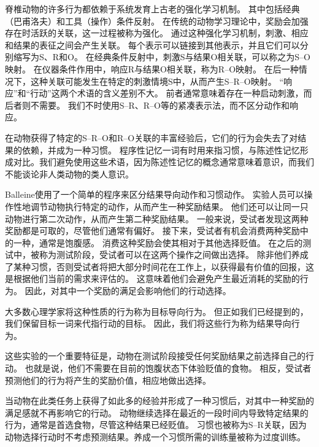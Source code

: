 脊椎动物的许多行为都依赖于系统发育上古老的强化学习机制。
其中包括经典（巴甫洛夫）和工具（操作）条件反射\cite{Dickinson 1980}。
在传统的动物学习理论中，奖励会加强存在时活跃的关联，这一过程被称为强化。
通过这种强化学习机制，刺激、相应和结果的表征之间会产生关联。
每个表示可以链接到其他表示，并且它们可以分别缩写为S、R和O。
在经典条件反射中，刺激S与结果O相关联，可以称之为S–O映射。
在仪器条件作用中，响应R与结果O相关联，称为R–O映射。
在后一种情况下，这种关联可能发生在特定的刺激情境S中，从而产生S–R–O映射。
“响应”和“行动”这两个术语的含义差别不大。
前者通常意味着存在一种启动刺激，而后者则不需要。
我们不时使用S–R、R–O等的紧凑表示法，而不区分动作和响应。\par


在动物获得了特定的S–R–O和R–O关联的丰富经验后，它们的行为会失去了对结果的依赖，并成为一种习惯。
程序性记忆一词有时用来指习惯，与陈述性记忆形成对比。我们避免使用这些术语，因为陈述性记忆的概念通常意味着意识，而我们不能谈论非人类动物的类人意识。\par


Balleine\cite{balleine2003effect}使用了一个简单的程序来区分结果导向动作和习惯动作。
实验人员可以操作性地调节动物执行特定的动作，从而产生一种奖励结果。
他们还可以让同一只动物进行第二次动作，从而产生第二种奖励结果。
一般来说，受试者发现这两种奖励都是可取的，尽管他们通常有偏好。
接下来，受试者有机会消费两种奖励中的一种，通常是饱腹感。
消费这种奖励会使其相对于其他选择贬值。
在之后的测试中，被称为测试阶段，受试者可以在这两个操作之间做出选择。
除非他们养成了某种习惯，否则受试者将把大部分时间花在工作上，以获得最有价值的回报，这是根据他们当前的需求来评估的。
这意味着他们会避免产生最近消耗的奖励的行为。
因此，对其中一个奖励的满足会影响他们的行动选择。\par


大多数心理学家将这种性质的行为称为目标导向行为。
但正如我们已经提到的，我们保留目标一词来代指行动的目标。
因此，我们将这些行为称为结果导向行为。\par


这些实验的一个重要特征是，动物在测试阶段接受任何奖励结果之前选择自己的行动。
也就是说，他们不需要在目前的饱腹状态下体验贬值的食物。
相反，受试者预测他们的行为将产生的奖励价值，相应地做出选择。\par


当动物在此类任务上获得了如此多的经验并形成了一种习惯后，对其中一种奖励的满足感就不再影响它的行动。
动物继续选择在最近的一段时间内导致特定结果的行为，通常是首选食物，尽管这种结果已经贬值。
习惯也被称为S–R关联，因为动物选择行动时不考虑预测结果。养成一个习惯所需的训练量被称为过度训练。\par


